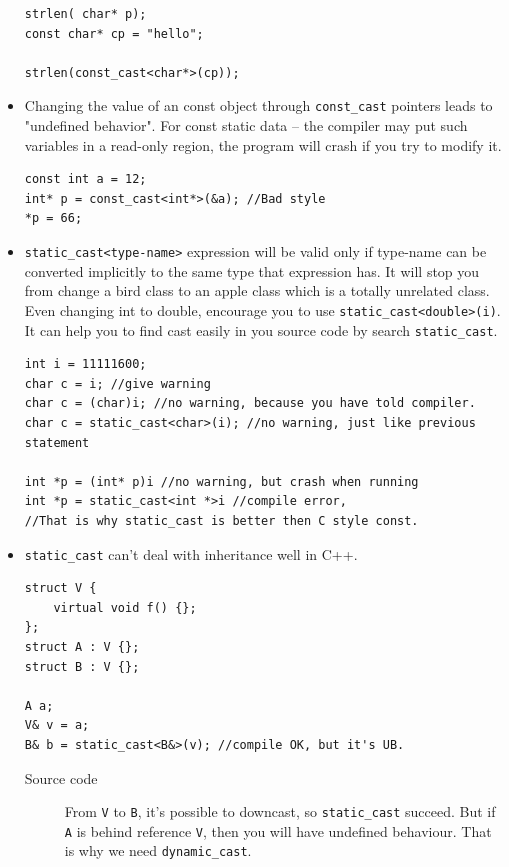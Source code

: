 \documentclass[a4paper,11pt,twoside]{book}
\begin{document}
\begin{itemize}
\begin{lstlisting}[numbers = none]
strlen( char* p);
const char* cp = "hello";

strlen(const_cast<char*>(cp));	
\end{lstlisting}

	\item Changing the value of an const object through \texttt{const\_cast} pointers leads to  "undefined behavior". For const static data -- the compiler may put such variables in a read-only region, the program will crash if you try to modify it.

\begin{lstlisting}[numbers = none]
const int a = 12;
int* p = const_cast<int*>(&a); //Bad style
*p = 66;
\end{lstlisting}

	\item \texttt{static\_cast<type-name>} expression will be valid only if type-name can be converted implicitly to the same type that expression has.  It will stop you from change a bird class to an apple class which is a totally unrelated class.  Even changing int to double, encourage you to use \texttt{static\_cast<double>(i)}.  It can help you to find cast easily in you source code by search \texttt{static\_cast}.
\begin{lstlisting}[numbers = none]
int i = 11111600;
char c = i; //give warning
char c = (char)i; //no warning, because you have told compiler.
char c = static_cast<char>(i); //no warning, just like previous statement

int *p = (int* p)i //no warning, but crash when running
int *p = static_cast<int *>i //compile error, 
//That is why static_cast is better then C style const.
\end{lstlisting}

	\item  \texttt{static\_cast} can't deal with inheritance well in C++. 
\begin{lstlisting}[numbers = none]
struct V {
	virtual void f() {};
};
struct A : V {};
struct B : V {};

A a;
V& v = a;
B& b = static_cast<B&>(v); //compile OK, but it's UB.
\end{lstlisting}
\begin{description}
	\item[Source code] From \texttt{V} to \texttt{B}, it's possible to downcast, so \texttt{static\_cast} succeed. But if \texttt{A} is behind reference \texttt{V}, then you will have undefined behaviour. That is why we need \texttt{dynamic\_cast}.
\end{description}	
	

\end{itemize}
\end{document}
